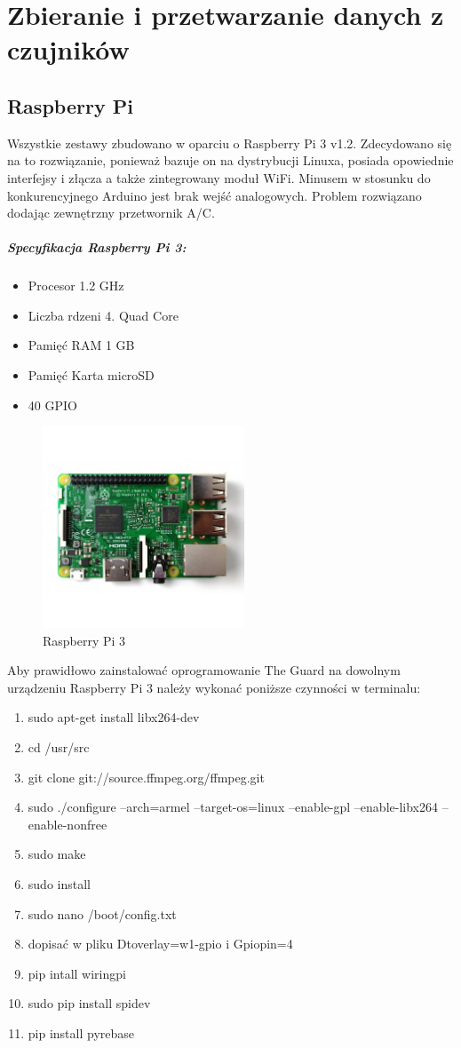 \chapter{Zbieranie i przetwarzanie danych z czujników}

\section*{Raspberry Pi}

Wszystkie zestawy zbudowano w oparciu o Raspberry Pi 3 v1.2. Zdecydowano się na to rozwiązanie, ponieważ bazuje on na dystrybucji Linuxa, posiada opowiednie interfejsy i złącza a także zintegrowany moduł WiFi. Minusem w stosunku do konkurencyjnego Arduino jest brak wejść analogowych. Problem rozwiązano dodając zewnętrzny przetwornik A/C.
\paragraph{Specyfikacja Raspberry Pi 3:}
\begin{itemize} 
\item Procesor 1.2 GHz
\item Liczba rdzeni 4. Quad Core
\item Pamięć RAM 1 GB
\item Pamięć Karta microSD
\item 40 GPIO
\end{itemize}
\begin{figure}[h]
	\centering
	\includegraphics[width=6cm]{raspberry.jpg}
	\caption{Raspberry Pi 3}
\end{figure}
Aby prawidłowo zainstalować oprogramowanie The Guard na dowolnym urządzeniu Raspberry Pi 3 należy wykonać poniższe czynności w terminalu:
\begin{enumerate} 
\item sudo apt-get install libx264-dev
\item cd /usr/src
\item git clone git://source.ffmpeg.org/ffmpeg.git
\item sudo ./configure --arch=armel --target-os=linux --enable-gpl --enable-libx264 --enable-nonfree
\item sudo make
\item sudo install
\item sudo nano /boot/config.txt
\item dopisać w pliku Dtoverlay=w1-gpio i Gpiopin=4
\item pip intall wiringpi
\item sudo pip install spidev
\item pip install pyrebase
\end{enumerate}
